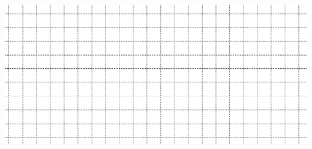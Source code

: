 \documentclass[12pt,a4paper]{article}
\begin{document}
\vspace{2em}
\includegraphics[width=16cm]{img/prova-4-civ-malha-2}

\end{document}
